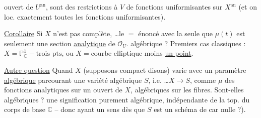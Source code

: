 ouvert  de $U^{\mathrm{an}}$, sont des restrictions à $V$ de fonctions  uniformisantes sur $X^{\mathrm{an}}$ (et on   loc. exactement toutes les fonctions uniformisantes).

\uline{Corollaire} Si $X$ n'est pas complète, \ldots le $=$ énoncé avec la seule  que $\mu(t)$ est seulement une section \uline{analytique} de $\mathcal O_U$.   algébrique ? Premiers cas classiques : $X=\mathbb P^1_{\mathbb C}-\text{trois pts}$, ou $X=\text{courbe elliptique}$ moins \uline{un point}.

\uline{Autre question} Quand $X$ (supposons compact disons) varie avec un paramètre \uline{algébrique} parcourant une variété algébrique $S$, i.e. \ldots $X\longrightarrow S$,  comme $\mu$ des fonctions analytiques sur un ouvert de $X$, algébriques sur les fibres. Sont-elles algébriques ?  une signification purement algébrique, indépendante de la top. du corps de base $\mathbb C$ -- donc ayant un sens dès que $S$ est un schéma de car nulle ?).
